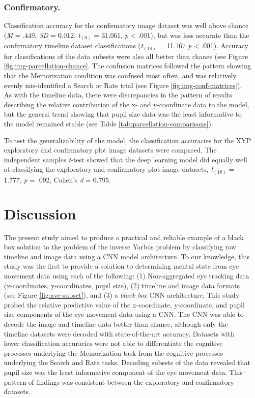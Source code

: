 \documentclass[
  english,
  man,floatsintext]{apa6}
\begin{document}
\subsubsection{Confirmatory.}

Classification accuracy for the confirmatory image dataset was well above chance (\emph{M} = .449, \emph{SD} = 0.012, \emph{t}\(_{(9)}\) = 31.061, \emph{p} \textless{} .001), but was less accurate than the confirmatory timeline dataset classifications (\emph{t}\(_{(18)}\) = 11.167 \emph{p} \textless{} .001). Accuracy for classifications of the data subsets were also all better than chance (see Figure \ref{fig:img-parcellation-chance}. The confusion matrices followed the pattern showing that the Memorization condition was confused most often, and was relatively evenly mis-identified a Search or Rate trial (see Figure \ref{fig:img-conf-matrices}). As with the timeline data, there were discrepancies in the pattern of results describing the relative contribution of the x- and y-coordinate data to the model, but the general trend showing that pupil size data was the least informative to the model remained stable (see Table \ref{tab:parcellation-comparisons}).

To test the generalizability of the model, the classification accuracies for the XYP exploratory and confirmatory plot image datasets were compared. The independent samples \emph{t}-test showed that the deep learning model did equally well at classifying the exploratory and confirmatory plot image datasets, \emph{t}\(_{(18)}\) = 1.777, \emph{p} = .092, Cohen's \emph{d} = 0.795.

\section{Discussion}

The present study aimed to produce a practical and reliable example of a black box solution to the problem of the inverse Yarbus problem by classifying raw timeline and image data using a CNN model architecture. To our knowledge, this study was the first to provide a solution to determining mental state from eye movement data using each of the following: (1) Non-aggregated eye tracking data (x-coordinates, y-coordinates, pupil size), (2) timeline and image data formats (see Figure \ref{fig:ave-subset}), and (3) a \emph{black box} CNN architecture. This study probed the relative predictive value of the x-coordinate, y-coordinate, and pupil size components of the eye movement data using a CNN. The CNN was able to decode the image and timeline data better than chance, although only the timeline datasets were decoded with state-of-the-art accuracy. Datasets with lower classification accuracies were not able to differentiate the cognitive processes underlying the Memorization task from the cognitive processes underlying the Search and Rate tasks. Decoding subsets of the data revealed that pupil size was the least informative component of the eye movement data. This pattern of findings was consistent between the exploratory and confirmatory datasets.
\end{document}
